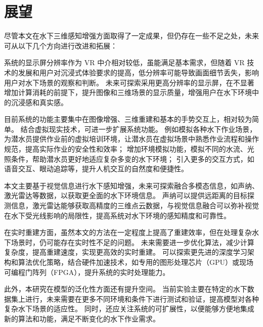 \section{展望}
尽管本文在水下三维感知增强方面取得了一定成果，但仍存在一些不足之处，未来可从以下几个方向进行改进和拓展：

系统的显示屏分辨率作为 VR 中介相对较低，虽能满足基本需求，但随着 VR 技术的发展和用户对沉浸式体验要求的提高，低分辨率可能导致画面细节丢失，影响用户对水下场景的观察和判断。
未来可探索采用更高分辨率的显示屏，在不显著增加计算消耗的前提下，提升图像和三维场景的显示质量，增强用户在水下环境中的沉浸感和真实感。

目前系统的功能主要集中在图像增强、三维重建和基本的手势交互上，相对较为简单。
结合虚拟现实技术，可进一步扩展系统功能。
例如模拟各种水下作业场景，为潜水员提供作业前的虚拟培训环境，让潜水员在虚拟场景中熟悉作业流程和操作规范，提高实际作业的安全性和效率；
增加环境模拟功能，模拟不同的水流、光照条件，帮助潜水员更好地适应复杂多变的水下环境；
引入更多的交互方式，如语音交互、眼动追踪等，提升人机交互的自然度和便捷性。

本文主要基于视觉信息进行水下感知增强，未来可探索融合多模态信息，如声纳、激光雷达等数据，以获取更全面的水下环境信息。
声纳可以提供远距离的目标探测信息，激光雷达能够获取高精度的三维点云数据，与视觉信息融合可以弥补视觉在水下受光线影响的局限性，提高系统对水下环境的感知精度和可靠性。

在实时重建方面，虽然本文的方法在一定程度上提高了重建效率，但在处理复杂水下场景时，仍可能存在实时性不足的问题。
未来需要进一步优化算法，减少计算复杂度，提高重建速度，实现更高效的实时重建。
可以探索更先进的深度学习架构和算法优化策略，结合硬件加速技术，如专用的图形处理芯片（GPU）或现场可编程门阵列（FPGA），提升系统的实时处理能力。

此外，本研究在模型的泛化性方面还有提升空间。
当前实验主要在特定的水下数据集上进行，未来需要在更多不同环境和条件下进行测试和验证，提高模型对各种复杂水下场景的适应性。
同时，还应关注系统的可扩展性，以便能够方便地集成新的算法和功能，满足不断变化的水下作业需求。


